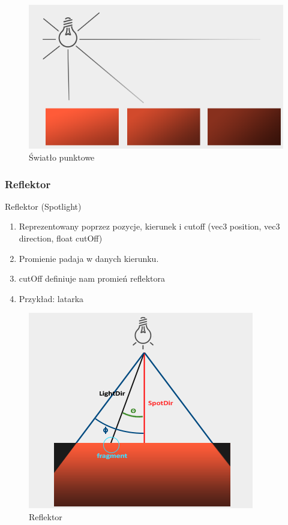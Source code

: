 \documentclass[12pt]{article}
\begin{document}
\begin{figure}[H]
	\centering
	\includegraphics[scale=0.5]{Pictures/point_light.png}
	\caption{Światło punktowe}
\end{figure}

\subsubsection{Reflektor}
Reflektor (Spotlight)
\begin{enumerate}
\item Reprezentowany poprzez pozycje, kierunek i cutoff (vec3 position, vec3 direction, float cutOff)
\item Promienie padaja w danych kierunku.
\item cutOff definiuje nam promień reflektora
\item Przykład: latarka
\end{enumerate}

\begin{figure}[H]
	\centering
	\includegraphics[scale=0.5]{Pictures/spotlight_light.png}
	\caption{Reflektor}
\end{figure}
\end{document}
